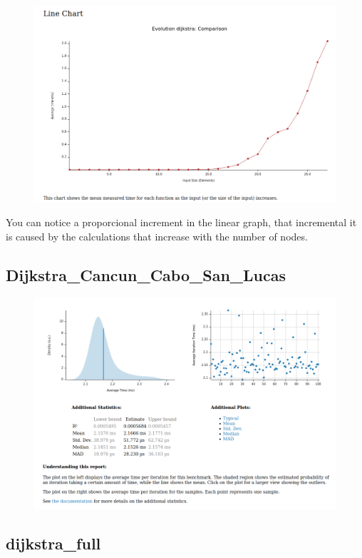 \begin{figure}[H]
\centering
\includegraphics[scale=0.4]{../img/Evolution bijkstrap_first}
\end{figure}

You can notice a proporcional increment in the linear graph, that incremental it is caused by
the calculations that increase with the number of nodes.

\subsection{Dijkstra\_Cancun\_Cabo\_San\_Lucas}

\begin{figure}[H]
\centering
\includegraphics[scale=0.4]{../img/Dijkstrack_cancun}
\end{figure}

\subsection{dijkstra\_full}


